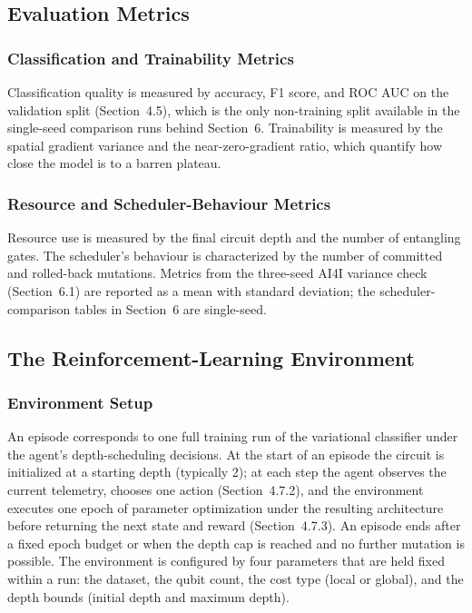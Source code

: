 \subsection{Evaluation Metrics}

\subsubsection{Classification and Trainability Metrics}
Classification quality is measured by accuracy, F1 score, and ROC AUC on the validation split (Section~4.5), which is the only non-training split available in the single-seed comparison runs behind Section~6. Trainability is measured by the spatial gradient variance and the near-zero-gradient ratio, which quantify how close the model is to a barren plateau.

\subsubsection{Resource and Scheduler-Behaviour Metrics}
Resource use is measured by the final circuit depth and the number of entangling gates. The scheduler's behaviour is characterized by the number of committed and rolled-back mutations. Metrics from the three-seed AI4I variance check (Section~6.1) are reported as a mean with standard deviation; the scheduler-comparison tables in Section~6 are single-seed.

\subsection{The Reinforcement-Learning Environment}
\subsubsection{Environment Setup}
An episode corresponds to one full training run of the variational classifier under the agent's depth-scheduling decisions. At the start of an episode the circuit is initialized at a starting depth (typically 2); at each step the agent observes the current telemetry, chooses one action (Section~4.7.2), and the environment executes one epoch of parameter optimization under the resulting architecture before returning the next state and reward (Section~4.7.3). An episode ends after a fixed epoch budget or when the depth cap is reached and no further mutation is possible. The environment is configured by four parameters that are held fixed within a run: the dataset, the qubit count, the cost type (local or global), and the depth bounds (initial depth and maximum depth).

